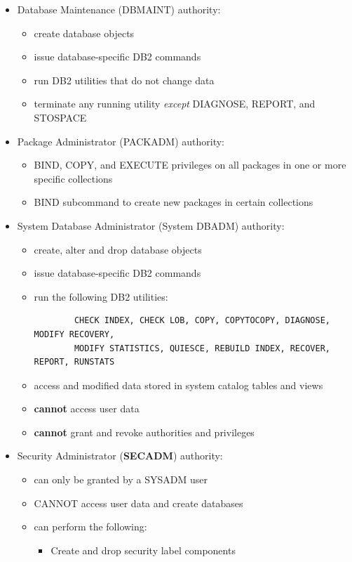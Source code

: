 \documentclass{article}
\begin{document}
\begin{itemize}
\begin{itemize}
\begin{itemize}
	\end{itemize}
\item Database Maintenance (DBMAINT) authority:
	\begin{itemize}
	\item create database objects
	\item issue database-specific DB2 commands
	\item run DB2 utilities that do not change data
	\item terminate any running utility \textit{except} DIAGNOSE, REPORT, and STOSPACE
	\end{itemize}
\item Package Administrator (PACKADM) authority:
	\begin{itemize}
	\item BIND, COPY, and EXECUTE privileges on all packages in one or more specific collections
	\item BIND subcommand to create new packages in certain collections
	\end{itemize}
\item System Database Administrator (System DBADM) authority:
	\begin{itemize}
	\item create, alter and drop database objects
	\item issue database-specific DB2 commands
	\item run the following DB2 utilities:
		\begin{verbatim}
		CHECK INDEX, CHECK LOB, COPY, COPYTOCOPY, DIAGNOSE, MODIFY RECOVERY,
		MODIFY STATISTICS, QUIESCE, REBUILD INDEX, RECOVER, REPORT, RUNSTATS
		\end{verbatim}
	\item access and modified data stored in system catalog tables and views
	\item \textbf{cannot} access user data
	\item \textbf{cannot} grant and revoke authorities and privileges
	\end{itemize}
\item Security Administrator (\textbf{SECADM}) authority:
	\begin{itemize}
	\item can only be granted by a SYSADM user
	\item CANNOT access user data and create databases
	\item can perform the following:
		\begin{itemize}
		\item Create and drop security label components

\end{itemize}
\end{itemize}
\end{itemize}
\end{itemize}
\end{document}
